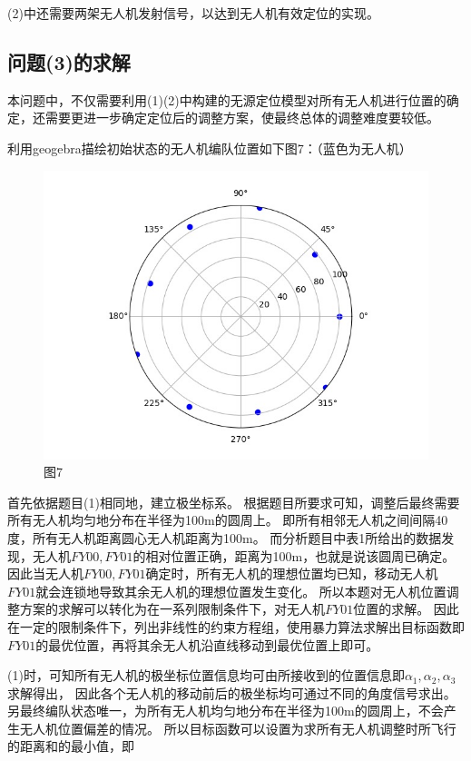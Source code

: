 \documentclass{ctexart}
\def\al{\alpha}
\begin{document}
	(2)中还需要两架无人机发射信号，以达到无人机有效定位的实现。
	
	\newpage
	\subsection{问题(3)的求解}
	本问题中，不仅需要利用(1)(2)中构建的无源定位模型对所有无人机进行位置的确定，还需要更进一步确定定位后的调整方案，使最终总体的调整难度要较低。

	\par
	利用geogebra描绘初始状态的无人机编队位置如下图7：（蓝色为无人机）

	\begin{figure}[htbp]
		\centering
		\includegraphics[scale=0.35]{pic/7.jpg}
		\caption*{图7}
	\end{figure}

	首先依据题目(1)相同地，建立极坐标系。
	根据题目所要求可知，调整后最终需要所有无人机均匀地分布在半径为100m的圆周上。
	即所有相邻无人机之间间隔40度，所有无人机距离圆心无人机距离为100m。
	而分析题目中表1所给出的数据发现，无人机$FY00,FY01$的相对位置正确，距离为100m，也就是说该圆周已确定。
	因此当无人机$FY00,FY01$确定时，所有无人机的理想位置均已知，移动无人机$FY01$就会连锁地导致其余无人机的理想位置发生变化。
	所以本题对无人机位置调整方案的求解可以转化为在一系列限制条件下，对无人机$FY01$位置的求解。
	因此在一定的限制条件下，列出非线性的约束方程组，使用暴力算法求解出目标函数即$FY01$的最优位置，再将其余无人机沿直线移动到最优位置上即可。
	
	(1)时，可知所有无人机的极坐标位置信息均可由所接收到的位置信息即$\al_1,\al_2,\al_3$求解得出，
	因此各个无人机的移动前后的极坐标均可通过不同的角度信号求出。
	另最终编队状态唯一，为所有无人机均匀地分布在半径为100m的圆周上，不会产生无人机位置偏差的情况。
	所以目标函数可以设置为求所有无人机调整时所飞行的距离和的最小值，即
\end{document}
